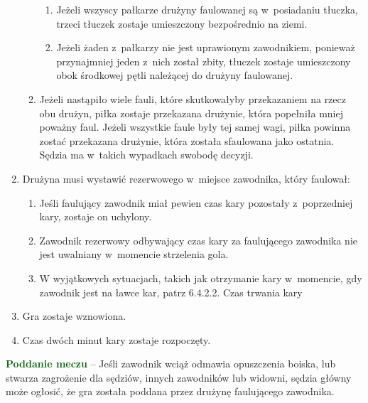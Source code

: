 \documentclass[12pt]{article}
\newcommand\other[1]{\bgroup\textcolor{darkgreen}{\textbf{#1}}}
\begin{document}
\begin{enumerate}
\begin{enumerate}
		            \begin{enumerate}
			            \item
			                  Jeżeli wszyscy pałkarze drużyny faulowanej są w~posiadaniu
			                  tłuczka, trzeci tłuczek zostaje umieszczony bezpośrednio na ziemi.
			            \item
			                  Jeżeli żaden z~pałkarzy nie jest uprawionym zawodnikiem, ponieważ
			                  przynajmniej jeden z~nich został zbity, tłuczek zostaje
			                  umieszczony obok środkowej pętli należącej do drużyny faulowanej.
		            \end{enumerate}
		      \item
		            Jeżeli nastąpiło wiele fauli, które skutkowałyby przekazaniem na
		            rzecz obu drużyn, piłka zostaje przekazana drużynie, która popełniła
		            mniej poważny faul. Jeżeli wszystkie faule były tej samej wagi,
		            piłka powinna zostać przekazana drużynie, która została sfaulowana
		            jako ostatnia. Sędzia ma w~takich wypadkach swobodę decyzji.
	      \end{enumerate}
	\item
	      Drużyna musi wystawić rezerwowego w~miejsce zawodnika, który faulował:

	      \begin{enumerate}
		      \item
		            Jeśli faulujący zawodnik miał pewien czas kary pozostały z~poprzedniej kary, zostaje on uchylony.
		      \item
		            Zawodnik rezerwowy odbywający czas kary za faulującego zawodnika nie
		            jest uwalniany w~momencie strzelenia gola.
		      \item
		            W wyjątkowych sytuacjach, takich jak otrzymanie kary w~momencie, gdy
		            zawodnik jest na ławce kar, patrz 6.4.2.2. Czas trwania kary
	      \end{enumerate}
	\item
	      Gra zostaje wznowiona.
	\item
	      Czas dwóch minut kary zostaje rozpoczęty.
\end{enumerate}

\other{Poddanie meczu} -- Jeśli zawodnik wciąż odmawia opuszczenia boiska,
lub stwarza zagrożenie dla sędziów, innych zawodników lub widowni,
sędzia główny może ogłosić, że gra została poddana przez drużynę
faulującego zawodnika.
\end{document}
